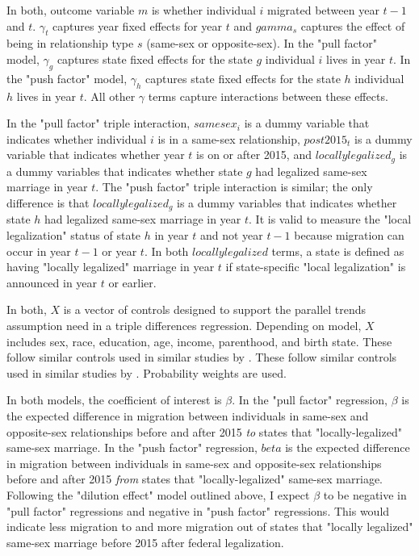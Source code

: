 \documentclass[12pt,letterpaper]{article}
\begin{document}
In both, outcome variable $m$ is whether individual $i$ migrated between year $t-1$ and $t$. $\gamma_t$ captures year fixed effects for year $t$ and $gamma_s$ captures the effect of being in relationship type $s$ (same-sex or opposite-sex). In the "pull factor" model, $\gamma_g$ captures state fixed effects for the state $g$ individual $i$ lives in year $t$. In the "push factor" model, $\gamma_h$ captures state fixed effects for the state $h$ individual $h$ lives in year $t$. All other $\gamma$ terms capture interactions between these effects. 

In the "pull factor" triple interaction, $samesex_i$ is a dummy variable that indicates whether individual $i$ is in a same-sex relationship, $post2015_t$ is a dummy variable that indicates whether year $t$ is on or after 2015, and $locally legalized_g$ is a dummy variables that indicates whether state $g$ had legalized same-sex marriage in year $t$. The "push factor" triple interaction is similar; the only difference is that $locally legalized_g$ is a dummy variables that indicates whether state $h$ had legalized same-sex marriage in year $t$. It is valid to measure the "local legalization" status of state $h$ in year $t$ and not year $t-1$ because migration can occur in year $t-1$ or year $t$. In both $locally legalized$ terms, a state is defined as having "locally legalized" marriage in year $t$ if state-specific "local legalization" is announced in year $t$ or earlier.

 In both, $X$ is a vector of controls designed to support the parallel trends assumption need in a triple differences regression. Depending on model, $X$ includes sex, race, education, age, income, parenthood, and birth state. These follow similar controls used in similar studies by \citet{1, 3, 5, 7, 12}. These follow similar controls used in similar studies by \citet{1, 3, 5, 7, 12}. Probability weights are used.

In both models, the coefficient of interest is $\beta$. In the "pull factor" regression, $\beta$ is the expected difference in migration between individuals in same-sex and opposite-sex relationships before and after 2015 \textit{to} states that "locally-legalized" same-sex marriage. In the "push factor" regression, $beta$ is the expected difference in migration between individuals in same-sex and opposite-sex relationships before and after 2015 \textit{from} states that "locally-legalized" same-sex marriage. Following the "dilution effect" model outlined above, I expect $\beta$ to be negative in "pull factor" regressions and negative in "push factor" regressions. This would indicate less migration to and more migration out of states that "locally legalized" same-sex marriage before 2015 after federal legalization.
\end{document}
